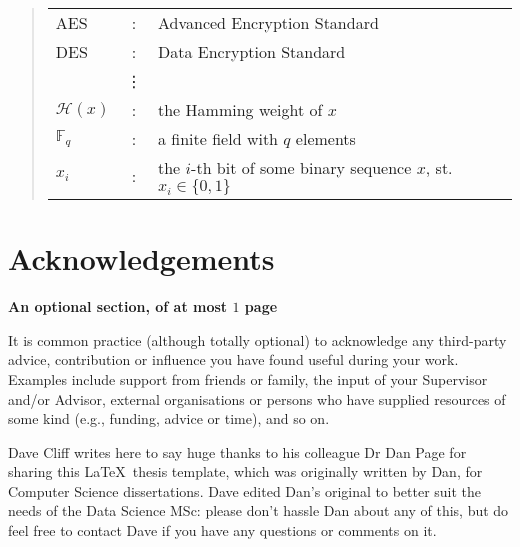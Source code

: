 \documentclass[ %
                    author={Daniel Page},
                supervisor={Dr. Andrew Calway},
                    degree={MSc},
                     title={Some Structural Guidelines for Data Science MSc Theses, Including Those With Long Titles that Run Across Multiple Lines on the Front Page},
                  subtitle={And those including an optional subtitle too, for good measure},
                      type={},
                      year={2021}]{dissertation}
\begin{document}
\begin{quote}
\noindent
\begin{tabular}{lcl}
AES                 &:     & Advanced Encryption Standard                                         \\
DES                 &:     & Data Encryption Standard                                             \\
                    &\vdots&                                                                      \\
${\mathcal H}( x )$ &:     & the Hamming weight of $x$                                            \\
${\mathbb  F}_q$    &:     & a finite field with $q$ elements                                     \\
$x_i$               &:     & the $i$-th bit of some binary sequence $x$, st. $x_i \in \{ 0, 1 \}$ \\
\end{tabular}
\end{quote}


\chapter*{Acknowledgements}

{\bf An optional section, of at most $1$ page}
\vspace{1cm} 

\noindent
It is common practice (although totally optional) to acknowledge any
third-party advice, contribution or influence you have found useful
during your work.  Examples include support from friends or family, 
the input of your Supervisor and/or Advisor, external organisations 
or persons who  have supplied resources of some kind (e.g., funding, 
advice or time), and so on.

\vspace{1cm}
Dave Cliff writes here to say huge thanks to his colleague Dr Dan Page for sharing this \LaTeX\ thesis template, which was originally written by Dan, for Computer Science dissertations. Dave edited Dan's original to better suit the needs of the Data Science MSc: please don't hassle Dan about any of this, but do feel free to contact Dave if you have any questions or comments on it.  

\end{document}
